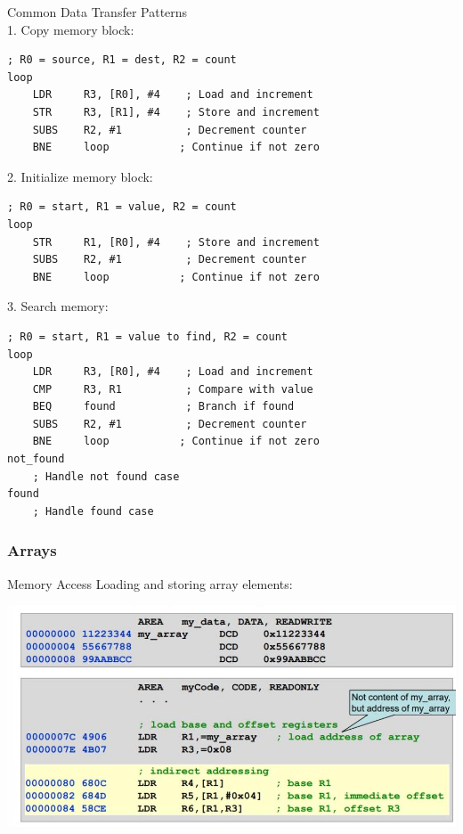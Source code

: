 \begin{KR}{Common Data Transfer Patterns}\\
1. Copy memory block:
\begin{lstlisting}[language=armasm, style=basesmol]
    ; R0 = source, R1 = dest, R2 = count
loop
    LDR     R3, [R0], #4    ; Load and increment
    STR     R3, [R1], #4    ; Store and increment
    SUBS    R2, #1          ; Decrement counter
    BNE     loop           ; Continue if not zero
\end{lstlisting}

2. Initialize memory block:
\begin{lstlisting}[language=armasm, style=basesmol]
    ; R0 = start, R1 = value, R2 = count
loop
    STR     R1, [R0], #4    ; Store and increment
    SUBS    R2, #1          ; Decrement counter
    BNE     loop           ; Continue if not zero
\end{lstlisting}

3. Search memory:
\begin{lstlisting}[language=armasm, style=basesmol]
    ; R0 = start, R1 = value to find, R2 = count
loop
    LDR     R3, [R0], #4    ; Load and increment
    CMP     R3, R1          ; Compare with value
    BEQ     found           ; Branch if found
    SUBS    R2, #1          ; Decrement counter
    BNE     loop           ; Continue if not zero
not_found
    ; Handle not found case
found
    ; Handle found case
\end{lstlisting}
\end{KR}

\columnbreak

\subsubsection{Arrays}

\begin{concept}{Memory Access}
Loading and storing array elements:

\includegraphics[width=\linewidth]{images/2024_12_29_79e6b22f503fb7b4f718g-03(1)}
\end{concept}

